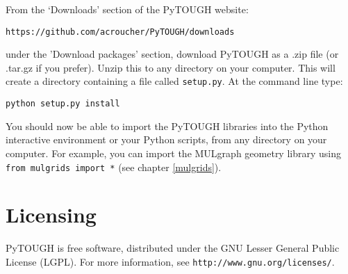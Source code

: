 From the `Downloads' section of the PyTOUGH website:

\texttt{https://github.com/acroucher/PyTOUGH/downloads}

under the 'Download packages' section, download PyTOUGH as a .zip file (or .tar.gz if you prefer).  Unzip this to any directory on your computer.  This will create a directory containing a file called \texttt{setup.py}.  At the command line type:

\texttt{python setup.py install}

You should now be able to import the PyTOUGH libraries into the Python interactive environment or your Python scripts, from any directory on your computer.  For example, you can import the MULgraph geometry library using \texttt{from mulgrids import *} (see chapter \ref{mulgrids}).

\section{Licensing}

PyTOUGH is free software, distributed under the GNU Lesser General Public License (LGPL).  For more information, see \texttt{http://www.gnu.org/licenses/}.
